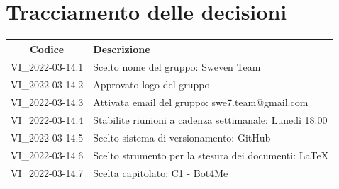 \documentclass[12pt, a4paper,table]{article}
\begin{document}
	\section*{Tracciamento delle decisioni}
	\begin{tabular}{ |c|l| }
		\hline
		\textbf{Codice} & \textbf{Descrizione} \\
		\hline
		VI\_2022-03-14.1 & Scelto nome del gruppo: Sweven Team \\ \hline
		VI\_2022-03-14.2 & Approvato logo del gruppo\\ \hline
		VI\_2022-03-14.3 & Attivata email del gruppo: swe7.team@gmail.com\\ \hline
		VI\_2022-03-14.4 & Stabilite riunioni a cadenza settimanale: Lunedì 18:00\\ \hline
		VI\_2022-03-14.5 & Scelto sistema di versionamento: GitHub\\ \hline
		VI\_2022-03-14.6 & Scelto strumento per la stesura dei documenti: \LaTeX\\ \hline
		VI\_2022-03-14.7 & Scelta capitolato: C1 - Bot4Me\\
		\hline
	\end{tabular}
\end{document}
